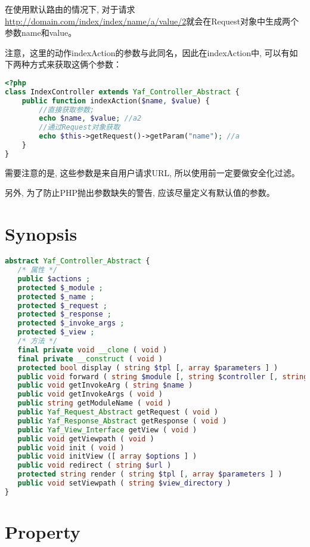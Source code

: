 在使用默认路由的情况下, 对于请求\url{http://domain.com/index/index/name/a/value/2}就会在Request对象中生成两个参数name和value。

注意，这里的动作indexAction的参数与此同名，因此在indexAction中, 可以有如下两种方式来获取这俩个参数：

\begin{lstlisting}[language=PHP]
<?php
class IndexController extends Yaf_Controller_Abstract {
    public function indexAction($name, $value) {
        //直接获取参数;
        echo $name, $value; //a2
        //通过Request对象获取
        echo $this->getRequest()->getParam("name"); //a
    }
}
\end{lstlisting}

需要注意的是, 这些参数是来自用户请求URL, 所以使用前一定要做安全化过滤。






另外, 为了防止PHP抛出参数缺失的警告, 应该尽量定义有默认值的参数。


\section{Synopsis}



\begin{lstlisting}[language=PHP]
abstract Yaf_Controller_Abstract {
   /* 属性 */
   public $actions ;
   protected $_module ;
   protected $_name ;
   protected $_request ;
   protected $_response ;
   protected $_invoke_args ;
   protected $_view ;
   /* 方法 */
   final private void __clone ( void )
   final private __construct ( void )
   protected bool display ( string $tpl [, array $parameters ] )
   public void forward ( string $module [, string $controller [, string $action [, array $paramters ]]] )
   public void getInvokeArg ( string $name )
   public void getInvokeArgs ( void )
   public string getModuleName ( void )
   public Yaf_Request_Abstract getRequest ( void )
   public Yaf_Response_Abstract getResponse ( void )
   public Yaf_View_Interface getView ( void )
   public void getViewpath ( void )
   public void init ( void )
   public void initView ([ array $options ] )
   public void redirect ( string $url )
   protected string render ( string $tpl [, array $parameters ] )
   public void setViewpath ( string $view_directory )
}
\end{lstlisting}

\section{Property}


